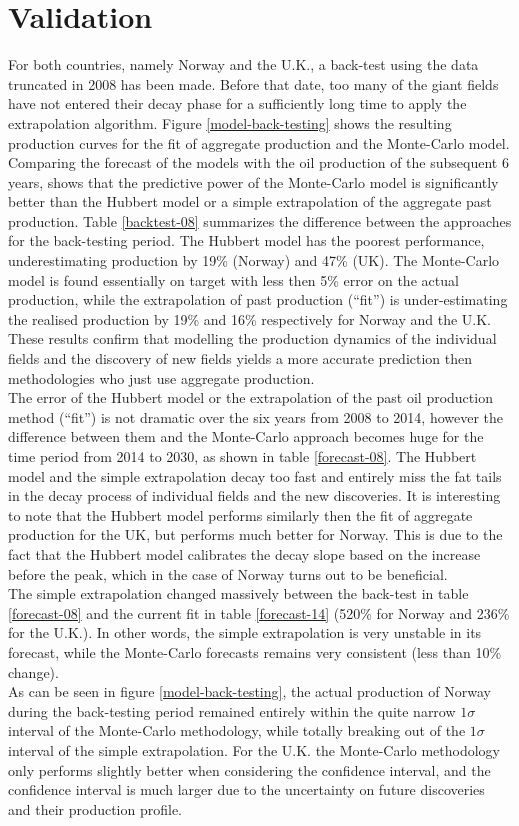\documentclass[review]{elsarticle}
\begin{document}
\section{Validation}

For both countries, namely Norway and the U.K., a back-test using
the data truncated in 2008 has been made. Before that date, too many
of the giant fields have not entered their decay phase for a sufficiently
long time to apply the extrapolation algorithm. Figure \ref{model-back-testing}
shows the resulting production curves for the fit of aggregate production and the Monte-Carlo model.\\
Comparing the forecast of the models with the oil production of the subsequent 6 years, shows that the predictive power of the Monte-Carlo model is significantly better than the Hubbert model or a simple extrapolation of the aggregate past production. Table \ref{backtest-08} summarizes the difference between the approaches for the back-testing period. The Hubbert model has the poorest performance, underestimating production by 19\% (Norway) and 47\% (UK). The Monte-Carlo model is found essentially on target with less then 5\% error on the actual production, while the extrapolation of past production (``fit'') is under-estimating the realised production by 19\% and 16\% respectively for Norway and the U.K. These results confirm that modelling the production dynamics of the individual fields and the discovery of new fields yields a more accurate prediction then methodologies who just use aggregate production.\\
The error of the Hubbert model or the extrapolation of the past oil production method (``fit'') is not dramatic over the six years from 2008 to 2014, however the difference between them and the Monte-Carlo approach becomes huge for the time period from 2014 to 2030, as shown in table \ref{forecast-08}. The Hubbert model and the simple extrapolation decay too fast and entirely miss the fat tails in the decay process of individual fields and the new discoveries. It is interesting to note that the Hubbert model performs similarly then the fit of aggregate production for the UK, but performs much better for Norway. This is due to the fact that the Hubbert model calibrates the decay slope based on the increase before the peak, which in the case of Norway turns out to be beneficial.\\
The simple extrapolation changed massively between the back-test in table \ref{forecast-08} and the current fit in table \ref{forecast-14} (520\% for Norway and 236\% for the U.K.). In other words, the simple extrapolation is very unstable in its forecast, while the Monte-Carlo forecasts remains very consistent (less than 10\% change).\\
As can be seen in figure \ref{model-back-testing}, the actual production
of Norway during the back-testing period remained entirely within
the quite narrow $1\sigma$ interval of the Monte-Carlo methodology,
while totally breaking out of the $1\sigma$ interval of the simple
extrapolation. For the U.K. the Monte-Carlo methodology only performs
slightly better when considering the confidence interval, and the
confidence interval is much larger due to the uncertainty on future
discoveries and their production profile.
\end{document}
